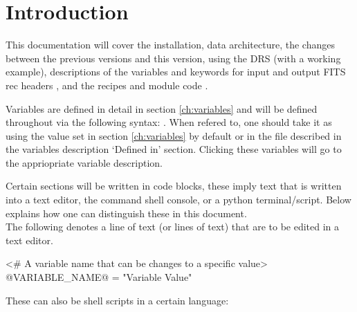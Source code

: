 \chapter{Introduction}
\label{chapter:intro}

This documentation will cover the installation, data architecture, \ifdevguide the changes between the previous versions and this version\fi, using the DRS (with a working example), descriptions of the variables \ifdevguide and keywords for input and output FITS rec headers \fi, and the recipes \ifdevguide and module code \fi.

\noindent Variables are defined in detail in section \ref{ch:variables} and will be defined throughout via the following syntax: . When refered to, one should take it as using the value set in section \ref{ch:variables} by default or in the file described in the variables description `Defined in' section. Clicking these variables will go to the appriopriate variable description.

\noindent Certain sections will be written in code blocks, these imply text that is written into a text editor, the command shell console, or a python terminal/script. Below explains how one can distinguish these in this document. \\

\noindent The following denotes a line of text (or lines of text) that are to be edited in a text editor.
\begin{textbox}[title={Generic text file}]
<# A variable name that can be changes to a specific value>
@VARIABLE_NAME@ = "Variable Value"
\end{textbox}
\vspace{0.5cm}

\noindent These can also be shell scripts in a certain language:
\vspace{0.5cm}

